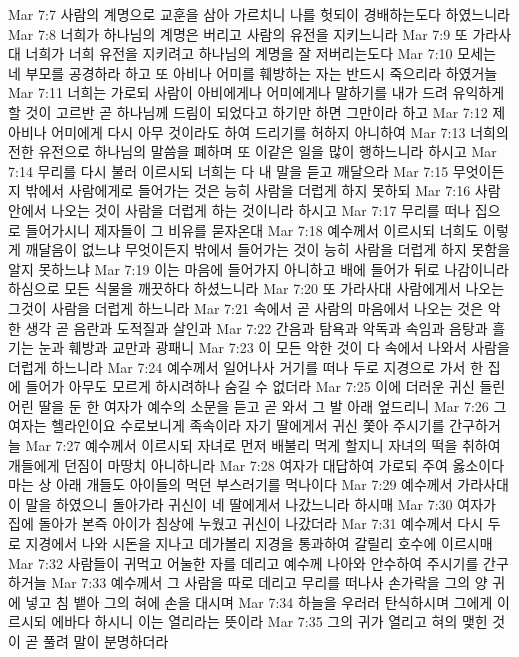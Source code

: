 Mar 7:7  사람의 계명으로 교훈을 삼아 가르치니 나를 헛되이 경배하는도다 하였느니라
Mar 7:8  너희가 하나님의 계명은 버리고 사람의 유전을 지키느니라
Mar 7:9  또 가라사대 너희가 너희 유전을 지키려고 하나님의 계명을 잘 저버리는도다
Mar 7:10  모세는 네 부모를 공경하라 하고 또 아비나 어미를 훼방하는 자는 반드시 죽으리라 하였거늘
Mar 7:11  너희는 가로되 사람이 아비에게나 어미에게나 말하기를 내가 드려 유익하게 할 것이 고르반 곧 하나님께 드림이 되었다고 하기만 하면 그만이라 하고
Mar 7:12  제 아비나 어미에게 다시 아무 것이라도 하여 드리기를 허하지 아니하여
Mar 7:13  너희의 전한 유전으로 하나님의 말씀을 폐하며 또 이같은 일을 많이 행하느니라 하시고
Mar 7:14  무리를 다시 불러 이르시되 너희는 다 내 말을 듣고 깨달으라
Mar 7:15  무엇이든지 밖에서 사람에게로 들어가는 것은 능히 사람을 더럽게 하지 못하되
Mar 7:16  사람 안에서 나오는 것이 사람을 더럽게 하는 것이니라 하시고
Mar 7:17  무리를 떠나 집으로 들어가시니 제자들이 그 비유를 묻자온대
Mar 7:18  예수께서 이르시되 너희도 이렇게 깨달음이 없느냐 무엇이든지 밖에서 들어가는 것이 능히 사람을 더럽게 하지 못함을 알지 못하느냐
Mar 7:19  이는 마음에 들어가지 아니하고 배에 들어가 뒤로 나감이니라 하심으로 모든 식물을 깨끗하다 하셨느니라
Mar 7:20  또 가라사대 사람에게서 나오는 그것이 사람을 더럽게 하느니라
Mar 7:21  속에서 곧 사람의 마음에서 나오는 것은 악한 생각 곧 음란과 도적질과 살인과
Mar 7:22  간음과 탐욕과 악독과 속임과 음탕과 흘기는 눈과 훼방과 교만과 광패니
Mar 7:23  이 모든 악한 것이 다 속에서 나와서 사람을 더럽게 하느니라
Mar 7:24  예수께서 일어나사 거기를 떠나 두로 지경으로 가서 한 집에 들어가 아무도 모르게 하시려하나 숨길 수 없더라
Mar 7:25  이에 더러운 귀신 들린 어린 딸을 둔 한 여자가 예수의 소문을 듣고 곧 와서 그 발 아래 엎드리니
Mar 7:26  그 여자는 헬라인이요 수로보니게 족속이라 자기 딸에게서 귀신 쫓아 주시기를 간구하거늘
Mar 7:27  예수께서 이르시되 자녀로 먼저 배불리 먹게 할지니 자녀의 떡을 취하여 개들에게 던짐이 마땅치 아니하니라
Mar 7:28  여자가 대답하여 가로되 주여 옳소이다마는 상 아래 개들도 아이들의 먹던 부스러기를 먹나이다
Mar 7:29  예수께서 가라사대 이 말을 하였으니 돌아가라 귀신이 네 딸에게서 나갔느니라 하시매
Mar 7:30  여자가 집에 돌아가 본즉 아이가 침상에 누웠고 귀신이 나갔더라
Mar 7:31  예수께서 다시 두로 지경에서 나와 시돈을 지나고 데가볼리 지경을 통과하여 갈릴리 호수에 이르시매
Mar 7:32  사람들이 귀먹고 어눌한 자를 데리고 예수께 나아와 안수하여 주시기를 간구하거늘
Mar 7:33  예수께서 그 사람을 따로 데리고 무리를 떠나사 손가락을 그의 양 귀에 넣고 침 뱉아 그의 혀에 손을 대시며
Mar 7:34  하늘을 우러러 탄식하시며 그에게 이르시되 에바다 하시니 이는 열리라는 뜻이라
Mar 7:35  그의 귀가 열리고 혀의 맺힌 것이 곧 풀려 말이 분명하더라
